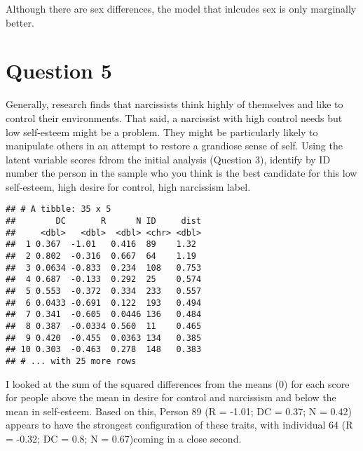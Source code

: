 \documentclass[]{article}
\newenvironment{Shaded}{\begin{snugshade}}{\end{snugshade}}
\newcommand{\KeywordTok}[1]{\textcolor[rgb]{0.13,0.29,0.53}{\textbf{#1}}}
\newcommand{\DataTypeTok}[1]{\textcolor[rgb]{0.13,0.29,0.53}{#1}}
\newcommand{\DecValTok}[1]{\textcolor[rgb]{0.00,0.00,0.81}{#1}}
\newcommand{\StringTok}[1]{\textcolor[rgb]{0.31,0.60,0.02}{#1}}
\newcommand{\OperatorTok}[1]{\textcolor[rgb]{0.81,0.36,0.00}{\textbf{#1}}}
\newcommand{\NormalTok}[1]{#1}
\begin{document}
Although there are sex differences, the model that inlcudes sex is only
marginally better.

\section{Question 5}\label{question-5}

Generally, research finds that narcissists think highly of themselves
and like to control their environments. That said, a narcissist with
high control needs but low self-esteem might be a problem. They might be
particularly likely to manipulate others in an attempt to restore a
grandiose sense of self. Using the latent variable scores fdrom the
initial analysis (Question 3), identify by ID number the person in the
sample who you think is the best candidate for this low self-esteem,
high desire for control, high narcissism label.

\begin{Shaded}
\end{Shaded}

\begin{verbatim}
## # A tibble: 35 x 5
##        DC       R      N ID     dist
##     <dbl>   <dbl>  <dbl> <chr> <dbl>
##  1 0.367  -1.01   0.416  89    1.32 
##  2 0.802  -0.316  0.667  64    1.19 
##  3 0.0634 -0.833  0.234  108   0.753
##  4 0.687  -0.133  0.292  25    0.574
##  5 0.553  -0.372  0.334  233   0.557
##  6 0.0433 -0.691  0.122  193   0.494
##  7 0.341  -0.605  0.0446 136   0.484
##  8 0.387  -0.0334 0.560  11    0.465
##  9 0.420  -0.455  0.0363 134   0.385
## 10 0.303  -0.463  0.278  148   0.383
## # ... with 25 more rows
\end{verbatim}

I looked at the sum of the squared differences from the means (0) for
each score for people above the mean in desire for control and
narcissism and below the mean in self-esteem. Based on this, Person 89
(R = -1.01; DC = 0.37; N = 0.42) appears to have the strongest
configuration of these traits, with individual 64 (R = -0.32; DC = 0.8;
N = 0.67)coming in a close second.
\end{document}
